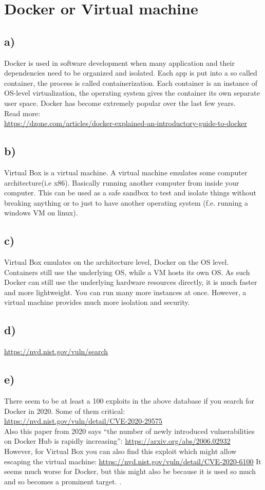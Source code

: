 \section{Docker or Virtual machine}
\subsection*{a)}
Docker is used in software development when many application and their dependencies need to be organized and isolated. Each app is put into a so called container, the process is called containerization. Each container is an instance of OS-level virtualization, the operating system gives the container its own separate user space. Docker has become extremely popular over the last few years.\\
Read more: \\
{\small\url{https://dzone.com/articles/docker-explained-an-introductory-guide-to-docker}}
\subsection*{b)}
Virtual Box is a virtual machine. A virtual machine emulates some computer architecture(i.e x86). Basically running another computer from inside your computer. This can be used as a safe sandbox to test and isolate things without breaking anything or to just to have another operating system (f.e. running a windows VM on linux). 
\subsection*{c)}
Virtual Box emulates on the architecture level, Docker on the OS level. Containers still use the underlying OS, while a VM hosts its own OS. As such Docker can still use the underlying hardware resources directly, it is much faster and more lightweight. You can run many more instances at once. However, a virtual machine provides much more isolation and security. 
\subsection*{d)}
\url{https://nvd.nist.gov/vuln/search}
\subsection*{e)}
There seem to be at least a 100 exploits in the above database if you search for Docker in 2020. Some of them critical: \\ {\small\url{https://nvd.nist.gov/vuln/detail/CVE-2020-29575}} \\
Also this paper from 2020 says \enquote{the number of newly introduced vulnerabilities on Docker Hub is rapidly increasing}:
{\small\url{https://arxiv.org/abs/2006.02932}} \\
However, for Virtual Box you can also find this exploit which might allow escaping the virtual machine: {\small \url{https://nvd.nist.gov/vuln/detail/CVE-2020-6100}}
It seems much worse for Docker, but this might also be because it is used so much and so becomes a prominent target. 
.

